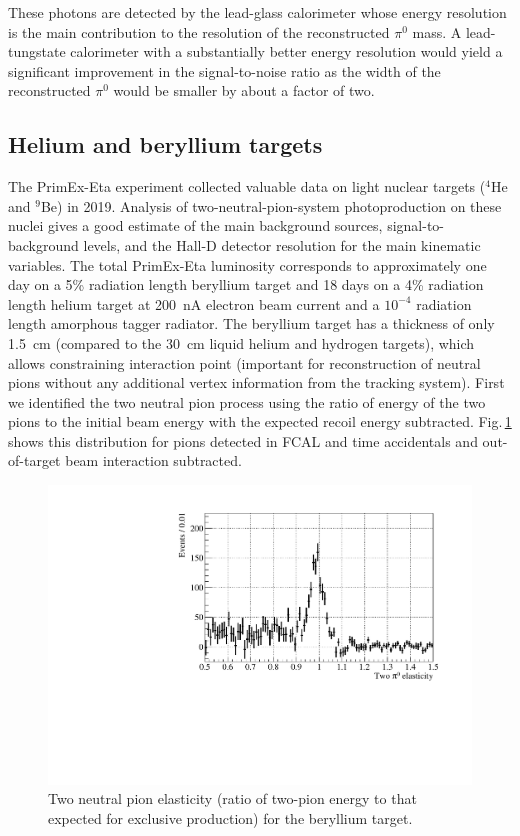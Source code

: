These photons are detected by the lead-glass calorimeter whose energy resolution is the
main contribution to the resolution of the reconstructed $\pi^{0}$
mass. A lead-tungstate calorimeter with a substantially better energy
resolution would yield a significant improvement in the signal-to-noise
ratio as the width of the reconstructed $\pi^{0}$ would be
smaller by about a factor of two.

\subsection{Helium and beryllium targets}

The PrimEx-Eta experiment collected valuable data on light nuclear
targets ($^4$He and $^9$Be) in 2019. Analysis of two-neutral-pion-system
photoproduction on these nuclei gives a good estimate of the
main background sources, signal-to-background levels, and the Hall-D
detector resolution for the main kinematic variables. The total PrimEx-Eta luminosity
corresponds to approximately one day on
a 5\% radiation length beryllium target and 18 days on a
4\% radiation length helium target at 200~nA electron beam
current and a $10^{-4}$ radiation length amorphous tagger
radiator. The beryllium target has a thickness of only 1.5~cm
(compared to the 30~cm liquid helium and hydrogen targets), which allows
constraining interaction point (important for reconstruction of neutral pions
without any additional vertex information from the
tracking system).  First we identified the two neutral pion
process using the ratio of energy of the two pions to the
initial beam energy with the expected recoil energy
subtracted. Fig.$\,$\ref{fig:pi0elastbe} shows this distribution for
pions detected in FCAL and time accidentals and out-of-target beam
interaction subtracted.
\begin{figure}[!h]
\centering\includegraphics[width=4.75in]{figures/be_elast1.pdf}
\caption{Two neutral pion elasticity (ratio of two-pion energy to that expected for exclusive production) for the beryllium target.
\label{fig:pi0elastbe}}
\end{figure}
